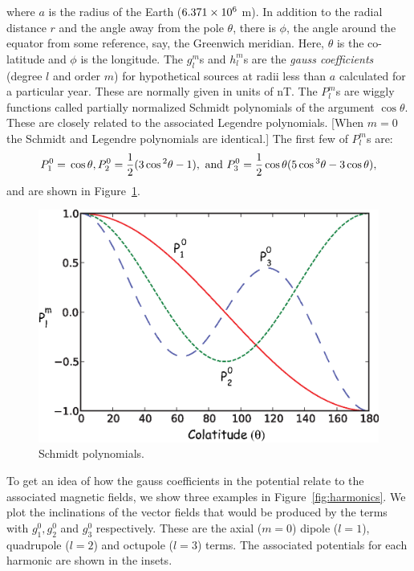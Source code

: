 \noindent where $a$ is the radius of the
Earth ($6.371 \cross 10^6$ m).    In addition to the radial distance $r$ and the angle away from the pole $\theta$, there is $\phi$, the angle around the equator from some reference, say, the Greenwich meridian.  Here, $\theta$ is the co-latitude and $\phi$ is the longitude. 
The  $g_l^m$s and $h_l^m$s are the
%
 {\it gauss coefficients} (degree $l$ and order $m$)   for hypothetical sources at radii less than $a$
calculated for a particular year. These are normally given in units of nT.  The
$P_l^m$s are  wiggly functions called partially normalized 
Schmidt polynomials of the argument $\cos \theta$. These are closely related to the associated
%
 Legendre polynomials.  [When $m=0$ the 
Schmidt and Legendre polynomials are identical.]  The first few of $P_l^m$s are: 
$$
P_1^0=\cos \theta, P_2^0 = {1\over 2}(3\cos^2\theta -1), \hbox{ and }	
P_3^0 = {1\over 2}\cos \theta(5\cos^3\theta -3\cos \theta ),
$$
\noindent and are shown in Figure~\ref{fig:schmidt}. 

\begin{figure}[htb]
\centering  \includegraphics[width=11 cm]{EPSfiles/schmidt.eps}
\caption{Schmidt polynomials.}
\label{fig:schmidt}
\end{figure}


To get an idea of how the  gauss coefficients in the potential relate to the associated magnetic fields, we show three examples 
 in  Figure~\ref{fig:harmonics}.  We plot the inclinations of the vector fields   that would be produced by the terms with $g_1^0, g_2^0$ and $g_3^0$ respectively.  
 These are the axial ($m=0$)  dipole ($l=1$), quadrupole ($l=2$) and octupole ($l=3$) terms. 
The  associated potentials for each harmonic  are shown in the   insets.  
 
